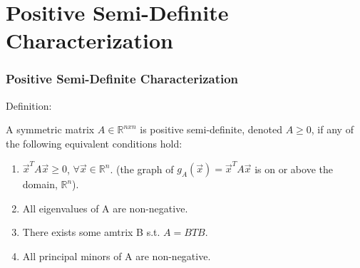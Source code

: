 \documentclass{beamer}
\begin{document}

\section{Positive Semi-Definite Characterization}
\begin{frame}
\frametitle{\textbf{Positive Semi-Definite Characterization} }
Definition: \vspace{0.2 cm}

A symmetric matrix $A \in \mathbb{R}^{nxn}$ is positive semi-definite, denoted $A \geq 0$, if any of the following equivalent conditions hold: \vspace{0.2 cm}


\begin{enumerate}
    \item $\vec{x}^{T}A\vec{x} \geq 0$, $\forall\vec{x} \in \mathbb{R}^{n}$. (the graph of $g_{A}(\vec{x}) = \vec{x}^{T}A\vec{x}$ is on or above the domain, $\mathbb{R}^{n}$).
    \item All eigenvalues of A are non-negative.
    \item There exists some amtrix B s.t. $A=B{T}B$.
    \item All principal minors of A are non-negative.
\end{enumerate}

\end{frame}

\end{document}
